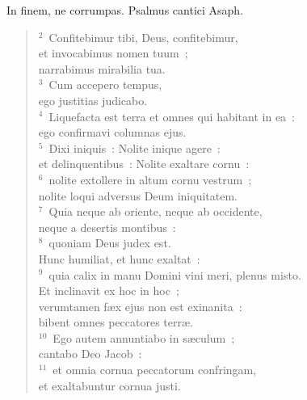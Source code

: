 \bchapter
\lettrine[lines=3,image=true,loversize=0.05,lraise=-0.03]{I}{}n finem, ne corrumpas. Psalmus cantici Asaph.
\begin{flushleft}\begin{verse}\vspace{6pt}${}^{2}$~Confitebimur tibi, Deus, confitebimur,\\ et invocabimus nomen tuum~;\\ narrabimus mirabilia tua.\\
${}^{3}$~Cum accepero tempus,\\ ego justitias judicabo.\\
${}^{4}$~Liquefacta est terra et omnes qui habitant in ea~:\\ ego confirmavi columnas ejus.\\
${}^{5}$~Dixi iniquis~: Nolite inique agere~:\\ et delinquentibus~: Nolite exaltare cornu~:\\
${}^{6}$~nolite extollere in altum cornu vestrum~;\\ nolite loqui adversus Deum iniquitatem.\\
${}^{7}$~Quia neque ab oriente, neque ab occidente,\\ neque a desertis montibus~:\\
${}^{8}$~quoniam Deus judex est.\\ Hunc humiliat, et hunc exaltat~:\\
${}^{9}$~quia calix in manu Domini vini meri, plenus misto.\\ Et inclinavit ex hoc in hoc~;\\ verumtamen f\ae x ejus non est exinanita~:\\ bibent omnes peccatores terr\ae .\\
${}^{10}$~Ego autem annuntiabo in s\ae culum~;\\ cantabo Deo Jacob~:\\
${}^{11}$~et omnia cornua peccatorum confringam,\\ et exaltabuntur cornua justi.\end{verse}\end{flushleft}



